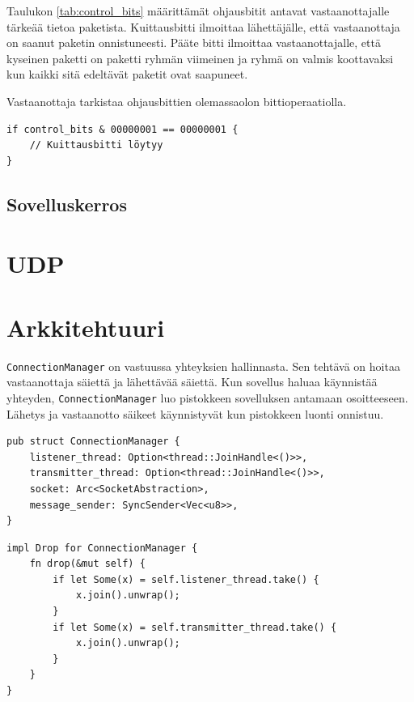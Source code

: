 \documentclass[a4paper,12pt]{article}
\begin{document}
    Taulukon \ref{tab:control_bits} määrittämät ohjausbitit antavat vastaanottajalle tärkeää tietoa paketista. Kuittausbitti ilmoittaa lähettäjälle, että vastaanottaja on saanut paketin onnistuneesti. Pääte bitti ilmoittaa vastaanottajalle, että kyseinen paketti on paketti ryhmän viimeinen ja ryhmä on valmis koottavaksi kun kaikki sitä edeltävät paketit ovat saapuneet. \par
    Vastaanottaja tarkistaa ohjausbittien olemassaolon bittioperaatiolla.
\begin{lstlisting}[caption={Kuittasbitin tarkistus ohjausbiteistä}, label={lst:ack_check}]
if control_bits & 00000001 == 00000001 {
    // Kuittausbitti löytyy
}
\end{lstlisting}




    \subsection{Sovelluskerros}\label{subsec:sovelluskerros}
    \blindtext


    \section{UDP}\label{sec:udp}
    \blindtext


    \section{Arkkitehtuuri}\label{sec:arkkitehtuuri} 
    \architecture

     \lstinline{ConnectionManager} on vastuussa yhteyksien hallinnasta. Sen tehtävä on 
    hoitaa vastaanottaja säiettä ja lähettävää säiettä. Kun sovellus haluaa käynnistää yhteyden, 
    \lstinline{ConnectionManager} luo pistokkeen sovelluksen antamaan osoitteeseen. 
    Lähetys ja vastaanotto säikeet käynnistyvät kun pistokkeen luonti onnistuu. 
    \par
    \begin{lstlisting}[caption={ConnectionManager rakenne}, label={lst:connectionmanager}]
pub struct ConnectionManager {
    listener_thread: Option<thread::JoinHandle<()>>,
    transmitter_thread: Option<thread::JoinHandle<()>>,
    socket: Arc<SocketAbstraction>,
    message_sender: SyncSender<Vec<u8>>,
}\end{lstlisting}

\begin{lstlisting}[caption={Drop ominaisuuden toteutus ConnectionManager:ille}, label={lst:connectionmanager_drop}]
impl Drop for ConnectionManager {
    fn drop(&mut self) {
        if let Some(x) = self.listener_thread.take() {
            x.join().unwrap();
        }
        if let Some(x) = self.transmitter_thread.take() {
            x.join().unwrap();
        }
    }
}
\end{lstlisting}
\end{document}
